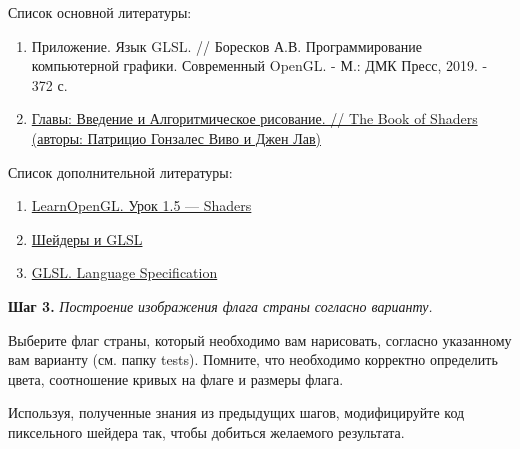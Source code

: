 \documentclass[a4paper,12pt]{article}
\theoremstyle{plain}
\begin{document}
    
    
    Список основной литературы:
    \begin{enumerate}
    \item 
    Приложение. Язык GLSL. // Боресков А.В. Программирование компьютерной графики. Современный OpenGL. - М.: ДМК Пресс, 2019. - 372 с.
    \item 
    \href{https://thebookofshaders.com/?lan=ru}{Главы: Введение и Алгоритмическое рисование. // The Book of Shaders (авторы: Патрицио Гонзалес Виво и Джен Лав)} 
    
    \end{enumerate}
    
    
    Список дополнительной литературы:
    \begin{enumerate}
    
    \item 
    \href{https://habr.com/ru/post/313380/
    }{LearnOpenGL. Урок 1.5 — Shaders}
    
    \item \href{https://webglfundamentals.org/webgl/lessons/ru/webgl-shaders-and-glsl.html}{Шейдеры и GLSL}
    
    \item 
    \href{https://www.khronos.org/registry/OpenGL/specs/gl/}{GLSL. Language Specification}
    
\end{enumerate}
    
    \textbf{Шаг 3.} \textit{Построение изображения флага страны согласно варианту.}
    
    Выберите флаг страны, который необходимо вам нарисовать, согласно указанному вам варианту (см. папку tests). Помните, что необходимо корректно определить цвета, соотношение кривых на флаге и размеры флага.
    
    Используя, полученные знания из предыдущих шагов, модифицируйте код пиксельного шейдера так, чтобы добиться желаемого результата.
\end{document}
